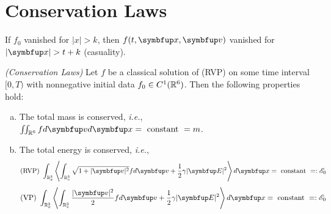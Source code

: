 \chapter{Conservation Laws}
\label{cha:conservatives}

\begin{proposition}
    If $f_0$ vanished for $|x|>k$, then $\ftxv$ vanished for $|\vx|>t+k$ (casuality).
\end{proposition}

\begin{lemma}\textit{(Conservation Laws)}
    Let $f$ be a classical solution of (RVP) on some time interval $[0,T)$ with nonnegative initial data $f_0\in C^1({\mathbb{R}}^6)$. Then the following properties hold:
    \begin{enumerate}[(a)]
        \item The total mass is conserved, \textit{i.e.}, $\iint_{\bbR^6}fd\vect{v} d\vect{x} = \text { constant } = m$.
        \item The total energy is conserved, \textit{i.e.},
        \begin{equation}
            \text{(RVP) } \int_{\bbRx}\left\langle\int_{\bbRv} \sqrt{1+|\vect{v}|^{2}} f d \vv+\frac{1}{2} \gamma|\vE|^{2}\right\rangle d \vect{x}=\text { constant }=:\mathscr{E}_{0}
        \end{equation}
        \begin{equation}
            \text{(VP) } \int_{\bbRx}\left\langle\int_{\bbRv} \frac{|\vect{v}|^{2}}{2}  f d \vv+\frac{1}{2} \gamma|\vE|^{2}\right\rangle d \vect{x}=\text { constant }=:\mathscr{E}_{0}
        \end{equation}

    \end{enumerate}
\end{lemma}

